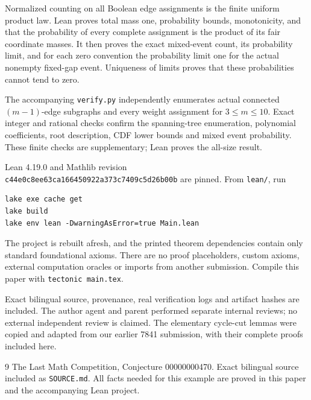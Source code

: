 \documentclass[11pt]{article}
\begin{document}
Normalized counting on all Boolean edge assignments is
the finite uniform product law. Lean proves total mass one,
probability bounds, monotonicity, and that the probability
of every complete assignment is the product of its fair
coordinate masses. It then proves the exact mixed-event
count, its probability limit, and for each zero convention
the probability limit one for the actual nonempty
fixed-gap event. Uniqueness of limits proves that these
probabilities cannot tend to zero.

The accompanying \texttt{verify.py} independently enumerates
actual connected $(m-1)$-edge subgraphs and every weight
assignment for $3\leq m\leq10$. Exact integer and rational
checks confirm the spanning-tree enumeration, polynomial
coefficients, root description, CDF lower bounds and mixed
event probability. These finite checks are supplementary;
Lean proves the all-size result.

Lean 4.19.0 and Mathlib revision\\
\texttt{c44e0c8ee63ca166450922a373c7409c5d26b00b}
are pinned. From \texttt{lean/}, run
\begin{verbatim}
lake exe cache get
lake build
lake env lean -DwarningAsError=true Main.lean
\end{verbatim}
The project is rebuilt afresh, and the printed theorem
dependencies contain only standard foundational axioms.
There are no proof placeholders, custom axioms, external
computation oracles or imports from another submission.
Compile this paper with \texttt{tectonic main.tex}.

Exact bilingual source, provenance, real verification logs
and artifact hashes are included. The author agent and
parent performed separate internal reviews; no external
independent review is claimed. The elementary cycle-cut
lemmas were copied and adapted from our earlier 7841
submission, with their complete proofs included here.

\begin{thebibliography}{9}
 The Last Math Competition,
Conjecture 00000000470. Exact bilingual source included
as \texttt{SOURCE.md}. All facts needed for this example
are proved in this paper and the accompanying Lean project.
\end{thebibliography}
\end{document}
